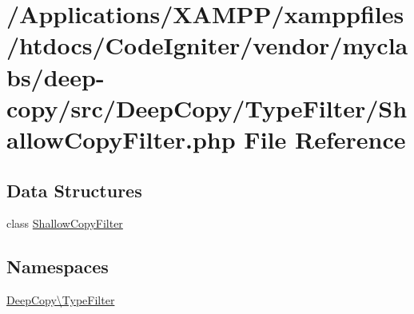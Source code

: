 \hypertarget{_shallow_copy_filter_8php}{}\section{/\+Applications/\+X\+A\+M\+P\+P/xamppfiles/htdocs/\+Code\+Igniter/vendor/myclabs/deep-\/copy/src/\+Deep\+Copy/\+Type\+Filter/\+Shallow\+Copy\+Filter.php File Reference}
\label{_shallow_copy_filter_8php}
\subsection*{Data Structures}
\begin{DoxyCompactItemize}
\item 
class \mbox{\hyperlink{class_deep_copy_1_1_type_filter_1_1_shallow_copy_filter}{Shallow\+Copy\+Filter}}
\end{DoxyCompactItemize}
\subsection*{Namespaces}
\begin{DoxyCompactItemize}
\item 
 \mbox{\hyperlink{namespace_deep_copy_1_1_type_filter}{Deep\+Copy\textbackslash{}\+Type\+Filter}}
\end{DoxyCompactItemize}
